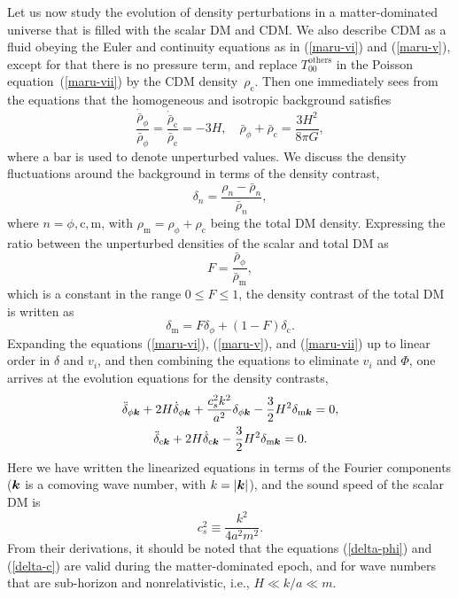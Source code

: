 \documentclass[11pt,nofootinbib]{article}
\numberwithin{equation}{section}
\begin{document}
Let us now study the evolution of density perturbations in a
matter-dominated universe that is filled with the scalar DM and CDM.
We also describe CDM
as a fluid obeying the 
Euler and continuity equations as in (\ref{maru-vi}) and
(\ref{maru-v}), except for that there is no pressure term,
and replace $T_{00}^{\mathrm{others}}$ in the Poisson
equation~(\ref{maru-vii}) by the CDM density~$\rho_{\mathrm{c}}$.
Then one immediately sees from the equations that the homogeneous and
isotropic background satisfies
\begin{equation}
 \frac{\dot{\bar{\rho}}_\phi}{\bar{\rho}_\phi}
  = \frac{\dot{\bar{\rho}}_\mathrm{c}}{\bar{\rho}_\mathrm{c}} = -3 H ,
  \quad
  \bar{\rho}_\phi + \bar{\rho}_{\mathrm{c}} =  \frac{3 H^2}{8 \pi G} ,
\label{bg_MD}
\end{equation}
where a bar is used to denote unperturbed values.
We discuss the density fluctuations around the background in
terms of the density contrast,
\begin{equation}
 \delta_n = \frac{\rho_n - \bar{\rho}_n}{\bar{\rho}_n},
\end{equation}
where $n = \phi, \mathrm{c}, \mathrm{m}$, with
$\rho_{\mathrm{m}} = \rho_\phi + \rho_{\mathrm{c}}$ being the total DM density.
Expressing the ratio between the unperturbed densities of the scalar and
total DM as 
\begin{equation}
 F = \frac{\bar{\rho}_\phi }{\bar{\rho}_\mathrm{m}},
\end{equation}
which is a constant in the range $ 0 \leq F \leq 1$,
the density contrast of the total DM is written as
\begin{equation}
 \delta_\mathrm{m} = F \delta_\phi + (1- F) \delta_{\mathrm{c}}. 
\end{equation}
Expanding the equations (\ref{maru-vi}), (\ref{maru-v}), and
(\ref{maru-vii}) up to linear order in $\delta$ and $v_{i}$,
and then combining the equations to 
eliminate $v_i$ and $\Phi$, one arrives at the evolution equations for
the density contrasts,
\begin{gather}
 \ddot{\delta}_{\phi \boldsymbol{k}} + 2 H \dot{\delta}_{\phi \boldsymbol{k}}
  + \frac{c_s^2 k^2}{a^2} \delta_{\phi \boldsymbol{k}}
 - \frac{3}{2} H^2 \delta_{\mathrm{m}\boldsymbol{k}} = 0,
 \label{delta-phi}
\\
 \ddot{\delta}_{\mathrm{c} \boldsymbol{k}} + 2 H \dot{\delta}_{\mathrm{c} \boldsymbol{k}}
 - \frac{3}{2} H^2 \delta_{\mathrm{m}\boldsymbol{k}} = 0.
 \label{delta-c}
\end{gather}
Here we have written the linearized equations in terms of the Fourier
components ($\boldsymbol{k}$ is a comoving wave number, with $k = \lvert\boldsymbol{k}\rvert$),
and the sound speed of the scalar DM is  
\begin{equation}
 c_s^2 \equiv \frac{k^2}{4 a^2 m^2}.
\end{equation}
From their derivations, it should be noted that 
the equations (\ref{delta-phi}) and (\ref{delta-c})
are valid during the matter-dominated epoch, and
for wave numbers that are sub-horizon and nonrelativistic,
i.e., \mbox{$H \ll k/a \ll m$}. 
\end{document}
